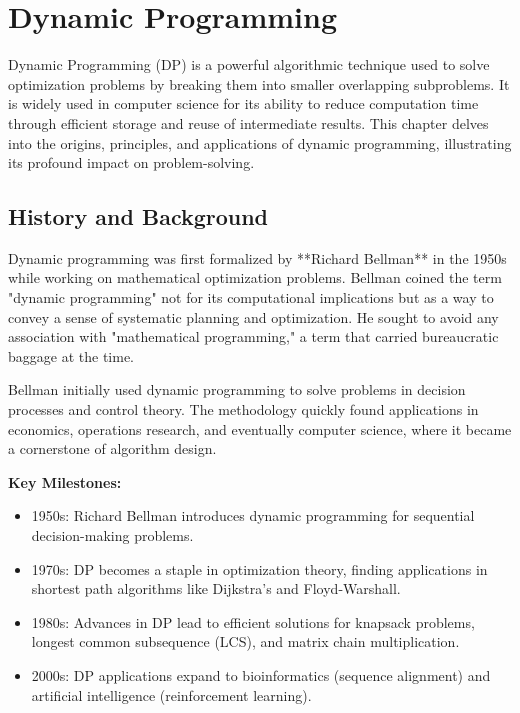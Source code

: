 
\chapter{Dynamic Programming}
\label{chap:Dynamic_Programming}

Dynamic Programming (DP) is a powerful algorithmic technique used to solve optimization problems by breaking them into smaller overlapping subproblems. It is widely used in computer science for its ability to reduce computation time through efficient storage and reuse of intermediate results. This chapter delves into the origins, principles, and applications of dynamic programming, illustrating its profound impact on problem-solving.

\section*{History and Background}

Dynamic programming was first formalized by **Richard Bellman** in the 1950s while working on mathematical optimization problems. Bellman coined the term "dynamic programming" not for its computational implications but as a way to convey a sense of systematic planning and optimization. He sought to avoid any association with "mathematical programming," a term that carried bureaucratic baggage at the time.

Bellman initially used dynamic programming to solve problems in decision processes and control theory. The methodology quickly found applications in economics, operations research, and eventually computer science, where it became a cornerstone of algorithm design.

\textbf{Key Milestones:}
\begin{itemize}
    \item 1950s: Richard Bellman introduces dynamic programming for sequential decision-making problems.
    \item 1970s: DP becomes a staple in optimization theory, finding applications in shortest path algorithms like Dijkstra's and Floyd-Warshall.
    \item 1980s: Advances in DP lead to efficient solutions for knapsack problems, longest common subsequence (LCS), and matrix chain multiplication.
    \item 2000s: DP applications expand to bioinformatics (sequence alignment) and artificial intelligence (reinforcement learning).
\end{itemize}

